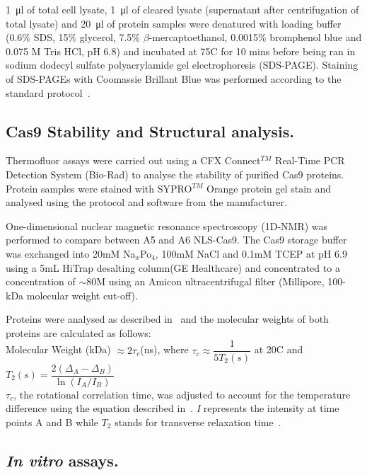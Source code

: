 \documentclass[11pt]{article}
\begin{document}
\SI{1}{\micro\litre} of total cell lysate, \SI{1}{\micro\litre} of cleared lysate (supernatant after centrifugation of total lysate) and \SI{20}{\micro\litre} of protein samples were denatured with loading buffer (0.6\% SDS, 15\% glycerol, 7.5\% $\beta$-mercaptoethanol, 0.0015\% bromphenol blue and 0.075 M Tris HCl, pH 6.8) and incubated at 75\degree C for 10 mins before being ran in sodium dodecyl sulfate polyacrylamide gel electrophoresis (SDS-PAGE). Staining of SDS-PAGEs with Coomassie Brillant Blue was performed according to the standard protocol~\citep{Lawrence2009}.

\subsection{Cas9 Stability and Structural analysis.}
Thermofluor assays were carried out using a CFX Connect$^{TM}$ Real-Time PCR Detection System (Bio-Rad) to analyse the stability of purified Cas9 proteins. Protein samples were stained with SYPRO$^{TM}$ Orange protein gel stain and analysed using the protocol and software from the manufacturer.

One-dimensional nuclear magnetic resonance spectroscopy (1D-NMR) was performed to compare between A5 and A6 NLS-Cas9. The Cas9 storage buffer was exchanged into 20mM Na$_{x}$Po$_{4}$, 100mM NaCl and 0.1mM TCEP at pH 6.9 using a 5mL HiTrap desalting column(GE Healthcare) and concentrated to a concentration of $\sim$80\si{\micro}M using an Amicon ultracentrifugal filter (Millipore, 100-kDa molecular weight cut-off). 

Proteins were analysed as described in~\cite{Anglister1993} and the molecular weights of both proteins are calculated as follows: \\
Molecular Weight (kDa) $\approx 2\tau_{c}$(ns), where  $\tau_{c} \approx \dfrac{1}{5T_{2} (s)}$ at 20\degree C and $T_{2} (s) = \dfrac{2(\Delta_A - \Delta_B)}{\ln(I_A / I_B)}$ \\
$\tau_{c}$, the rotational correlation time, was adjusted to account for the temperature difference using the equation described in~\cite{Daragan1997a}. \textit{I} represents the intensity at time points A and B while $T_{2}$ stands for transverse relaxation time~\citep{Anglister1993}.

\subsection{\textit{In vitro} assays.}
\end{document}
